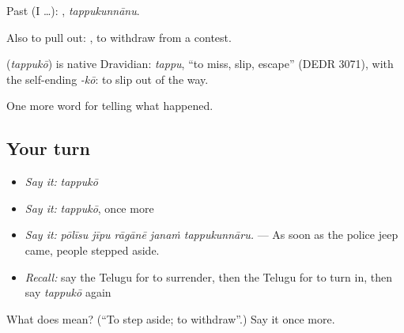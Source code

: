 Past (I …): , \emph{tappukunnānu}.

Also to pull out:   , to withdraw from a contest.

\begin{cousinweb}
\textbf{} (\emph{tappukō}) is native Dravidian: \emph{tappu}, \textquotedblleft{}to miss, slip, escape\textquotedblright{} (DEDR 3071), with the self-ending \emph{-kō}: to slip out of the way.
\end{cousinweb}

\begin{grammarlens}[title={What you've built}]
One more word for telling what happened.
\end{grammarlens}

\subsection*{Your turn}
\begin{itemize}
\raggedright
  \item \emph{Say it:} \emph{tappukō}
  \item \emph{Say it:} \emph{tappukō}, once more
  \item \emph{Say it:} \emph{pōlīsu jīpu rāgānē janaṁ tappukunnāru.} — As soon as the police jeep came, people stepped aside.
  \item \emph{Recall:} say the Telugu for to surrender, then the Telugu for to turn in, then say \emph{tappukō} again
\end{itemize}

\begin{tcolorbox}[breakable,colback=teal!4,colframe=teal!35!black,title={Before you move on}]
What does  mean? (\textquotedblleft{}To step aside; to withdraw\textquotedblright{}.) Say it once more.
\end{tcolorbox}
